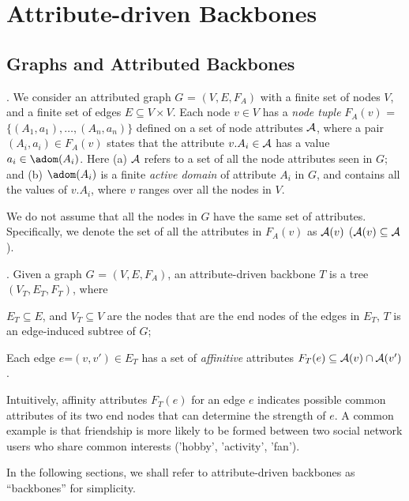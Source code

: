 \vspace{-1ex}
\section{Attribute-driven Backbones}
\label{sec-pre}

\subsection{Graphs and Attributed Backbones}

. We consider an 
attributed graph
$G$ = $(V,E,F_A)$ with a finite set of
nodes $V$, and
a finite set of edges $E\subseteq V\times V$.
Each node $v\in V$ has a
{\em node tuple} $F_A(v)$ =
$\{(A_1, a_1), \ldots, (A_n,a_n)\}$
defined on a set of node attributes $\A$,
where a pair $(A_i, a_i)\in F_A(v)$
states that the attribute $v.A_i\in\A$ has
a value $a_i\in\adom(A_i)$. Here
(a) $\A$ refers to a set of all the node
attributes seen in $G$; and (b)
$\adom(A_i)$ is a finite {\em active domain} of
attribute $A_i$ in $G$, and contains
all the values of $v.A_i$, where $v$ ranges
over all the nodes in $V$.


We do not assume that all the nodes in $G$
have the same set of attributes. Specifically,
 we denote the set of all the attributes in $F_A(v)$
as $\A(v)$ ($\A(v)\subseteq\A$).


.
Given a graph $G$ = $(V,E,F_A)$, an
attribute-driven backbone $T$
is a tree $(V_T,E_T,F_T)$, where
\vspace{-.75ex}
\bi
\item $E_T\subseteq E$, and $V_T\subseteq V$ are the nodes that are the end nodes of
the edges in $E_T$, \ie $T$ is an edge-induced subtree of $G$;
\item Each edge $e$=$(v,v')\in E_T$
has a set of {\em affinitive} attributes
$F_T(e)\subseteq\A(v)\cap\A(v')$.
\ei

Intuitively, affinity attributes $F_T(e)$
for an edge $e$ indicates possible
common attributes of its two end nodes
that can determine the strength of
$e$. A common example is that friendship
is more likely to be formed between two
social network users who share common interests
(\eg 'hobby', 'activity', 'fan').

\vspace{.5ex}
In the following sections, we shall refer to
attribute-driven backbones as ``backbones''
for simplicity.

